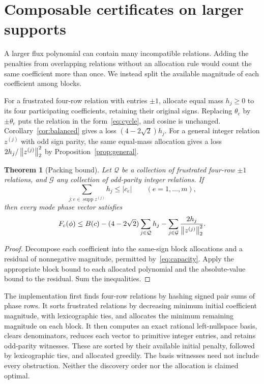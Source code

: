\documentclass[11pt]{article}
\newtheorem{theorem}{Theorem}[section]
\begin{document}
\section{Composable certificates on larger supports}\label{sec:packing}
A larger flux polynomial can contain many incompatible relations. Adding the penalties from overlapping relations without an allocation rule would count the same coefficient more than once. We instead split the available magnitude of each coefficient among blocks.

For a frustrated four-row relation with entries $\pm1$, allocate equal mass $h_j\ge0$ to its four participating coefficients, retaining their original signs. Replacing $\theta_e$ by $\pm\theta_e$ puts the relation in the form~\eqref{eq:cycle}, and cosine is unchanged. Corollary~\ref{cor:balanced} gives a loss $(4-2\sqrt2)h_j$. For a general integer relation $z^{(j)}$ with odd sign parity, the same equal-mass allocation gives a loss $2h_j/\left\lVert z^{(j)}\right\rVert_2^2$ by Proposition~\ref{prop:general}.

\begin{theorem}[Packing bound]\label{thm:packing}
Let $\mathcal Q$ be a collection of frustrated four-row $\pm1$ relations, and $\mathcal G$ any collection of odd-parity integer relations. If
\begin{equation}\label{eq:capacity}
 \sum_{j:e\in\operatorname{supp}z^{(j)}}h_j\le|c_e|\qquad(e=1,\ldots,m),
\end{equation}
then every mode phase vector satisfies
\begin{equation}\label{eq:packing}
 F_c(\phi)\le B(c)-(4-2\sqrt2)\sum_{j\in\mathcal Q}h_j
 -\sum_{j\in\mathcal G}\frac{2h_j}{\left\lVert z^{(j)}\right\rVert_2^2}.
\end{equation}
\end{theorem}
\begin{proof}
Decompose each coefficient into the same-sign block allocations and a residual of nonnegative magnitude, permitted by~\eqref{eq:capacity}. Apply the appropriate block bound to each allocated polynomial and the absolute-value bound to the residual. Sum the inequalities.
\end{proof}

The implementation first finds four-row relations by hashing signed pair sums of phase rows. It sorts frustrated relations by decreasing minimum initial coefficient magnitude, with lexicographic ties, and allocates the minimum remaining magnitude on each block. It then computes an exact rational left-nullspace basis, clears denominators, reduces each vector to primitive integer entries, and retains odd-parity witnesses. These are sorted by their available initial penalty, followed by lexicographic ties, and allocated greedily. The basis witnesses need not include every obstruction. Neither the discovery order nor the allocation is claimed optimal.
\end{document}
